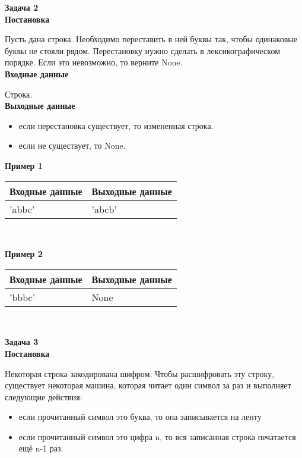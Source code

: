\documentclass[a4paper]{article}
\begin{document}
\newpage
\textbf{Задача 2}\\
 
 \textbf{Постановка}
 
 Пусть дана строка. Необходимо переставить в ней буквы так, чтобы одинаковые буквы не стояли рядом. Перестановку нужно сделать в лексикографическом порядке. Если это невозможно, то верните None.\\
 
 \textbf{Входные данные}
 
 Строка.\\
 
  \textbf{Выходные данные}
  
\begin{itemize}
    \item если перестановка существует, то измененная строка.
    \item если не существует, то None.
\end{itemize}
 
  \textbf{Пример 1}\\
  \begin{table}[!h]
  \centering
  \begin{tabular}{ | l | l | }
\hline
Входные данные & Выходные данные \\ \hline
'abbc' & 'abcb'  \\
\hline
\end{tabular}\\
\end{table}


\textbf{Пример 2}\\
\begin{table}[!h]
  \centering
  \begin{tabular}{ | l | l | }
\hline
Входные данные & Выходные данные \\ \hline
'bbbc' & None  \\
\hline
\end{tabular}\\
\end{table}

\newpage
\textbf{Задача 3}\\
 
 \textbf{Постановка}
 
Некоторая строка закодирована шифром. Чтобы расшифровать эту строку, существует некоторая машина, которая читает один символ за раз и выполняет следующие действия:
\begin{itemize}
    \item если прочитанный символ это буква, то она записывается на ленту
    \item если прочитанный символ это цифра n, то вся записанная строка печатается ещё n-1 раз.
\end{itemize}
\end{document}
